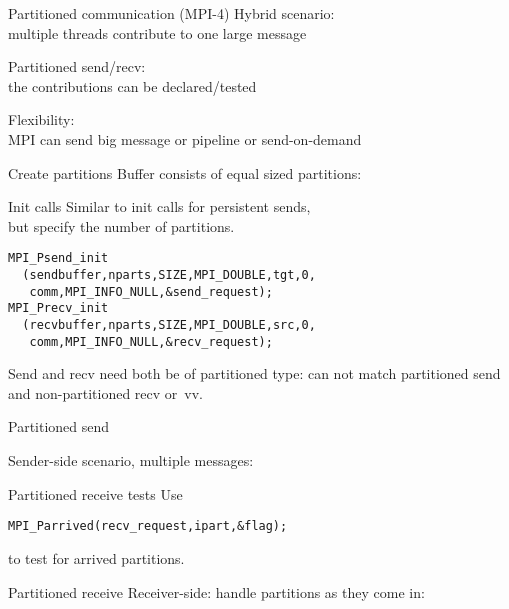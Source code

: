 
\begin{numberedframe}{Partitioned communication (MPI-4)}
  Hybrid scenario:\\
  multiple threads contribute to one large message

  Partitioned send/recv:\\
  the contributions can be declared/tested

  Flexibility:\\
  MPI can send big message or pipeline or send-on-demand
\end{numberedframe}

\begin{numberedframe}{Create partitions}
  Buffer consists of equal sized partitions:
  
\end{numberedframe}

\begin{numberedframe}{Init calls}
  Similar to init calls for persistent sends,\\
  but specify the number of partitions.
\begin{lstlisting}
MPI_Psend_init
  (sendbuffer,nparts,SIZE,MPI_DOUBLE,tgt,0,
   comm,MPI_INFO_NULL,&send_request);
MPI_Precv_init
  (recvbuffer,nparts,SIZE,MPI_DOUBLE,src,0,
   comm,MPI_INFO_NULL,&recv_request);
\end{lstlisting}
Send and recv need both be of partitioned type:
can not match partitioned send and non-partitioned recv or~vv.
\end{numberedframe}

\begin{numberedframe}{Partitioned send}

  Sender-side scenario, multiple messages:
  
\end{numberedframe}

\begin{numberedframe}{Partitioned receive tests}
Use 
\begin{lstlisting}
MPI_Parrived(recv_request,ipart,&flag);
\end{lstlisting}
to test for arrived partitions.
\end{numberedframe}

\begin{numberedframe}{Partitioned receive}
  Receiver-side: handle partitions as they come in:

\end{numberedframe}
